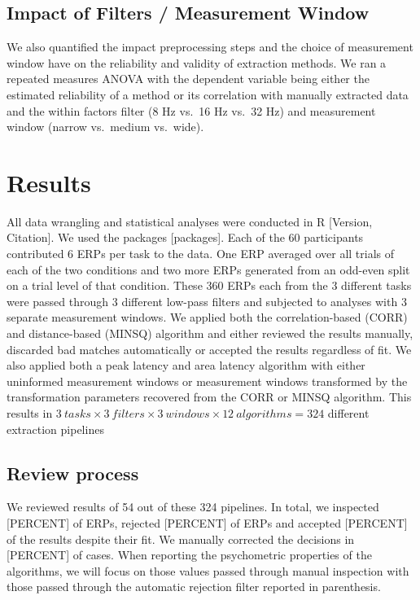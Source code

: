 \documentclass[
  man,floatsintext]{apa7}
\begin{document}
\hypertarget{impact-of-filters-measurement-window}{%
\subsection{Impact of Filters / Measurement Window}\label{impact-of-filters-measurement-window}}

We also quantified the impact preprocessing steps and the choice of measurement window have on the reliability and validity of extraction methods. We ran a repeated measures ANOVA with the dependent variable being either the estimated reliability of a method or its correlation with manually extracted data and the within factors filter (8 Hz vs.~16 Hz vs.~32 Hz) and measurement window (narrow vs.~medium vs.~wide).

\hypertarget{results}{%
\section{Results}\label{results}}

All data wrangling and statistical analyses were conducted in R {[}Version, Citation{]}. We used the packages {[}packages{]}. Each of the 60 participants contributed 6 ERPs per task to the data. One ERP averaged over all trials of each of the two conditions and two more ERPs generated from an odd-even split on a trial level of that condition. These 360 ERPs each from the 3 different tasks were passed through 3 different low-pass filters and subjected to analyses with 3 separate measurement windows. We applied both the correlation-based (CORR) and distance-based (MINSQ) algorithm and either reviewed the results manually, discarded bad matches automatically or accepted the results regardless of fit. We also applied both a peak latency and area latency algorithm with either uninformed measurement windows or measurement windows transformed by the transformation parameters recovered from the CORR or MINSQ algorithm. This results in \(3 \ tasks \times 3 \ filters \times 3 \ windows \times 12 \ algorithms = 324\) different extraction pipelines

\hypertarget{review-process}{%
\subsection{Review process}\label{review-process}}

We reviewed results of 54 out of these 324 pipelines. In total, we inspected {[}PERCENT{]} of ERPs, rejected {[}PERCENT{]} of ERPs and accepted {[}PERCENT{]} of the results despite their fit. We manually corrected the decisions in {[}PERCENT{]} of cases. When reporting the psychometric properties of the algorithms, we will focus on those values passed through manual inspection with those passed through the automatic rejection filter reported in parenthesis.
\end{document}
